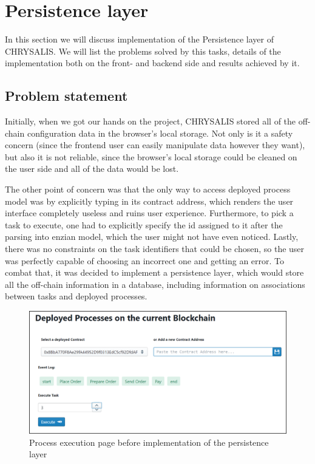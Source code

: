 %
\section{Persistence layer}
\label{sec:impr:persistence}

In this section we will discuss implementation of the Persistence layer of CHRYSALIS. We will list the problems solved by this tasks, details of the implementation both on the front- and backend side and results achieved by it. 

\subsection{Problem statement}
\label{sec:impr:persistence:problem}

Initially, when we got our hands on the project, CHRYSALIS stored all of the off-chain configuration data in the browser's local storage. Not only is it a safety concern (since the frontend user can easily manipulate data however they want), but also it is not reliable, since the browser's local storage could be cleaned on the user side and all of the data would be lost. 

The other point of concern was that the only way to access deployed process model was by explicitly typing in its contract address, which renders the user interface completely useless and ruins user experience. Furthermore, to pick a task to execute, one had to explicitly specify the id assigned to it after the parsing into enzian model, which the user might not have even noticed. Lastly, there was no constraints on the task identifiers that could be chosen, so the user was perfectly capable of choosing an incorrect one and getting an error. To combat that, it was decided to implement a persistence layer, which would store all the off-chain information in a database, including information on associations between tasks and deployed processes. 

\begin{figure}[hbt]
	\includegraphics[width=\textwidth]{gfx/persistence_before}
	\caption{Process execution page before implementation of the persistence layer}
	\label{fig:impr:persistence:before}
\end{figure}

